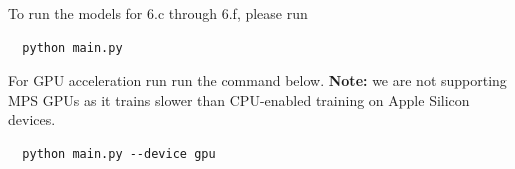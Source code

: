 To run the models for 6.c through 6.f, please run
\begin{verbatim}
  python main.py 
\end{verbatim}

For GPU acceleration run run the command below. \textbf{Note:} we are not supporting MPS GPUs as it trains slower than CPU-enabled training on Apple Silicon devices. 
\begin{verbatim}
  python main.py --device gpu
\end{verbatim}

\begin{enumerate}

  

  

  

  

  

  

  

  


\end{enumerate}


